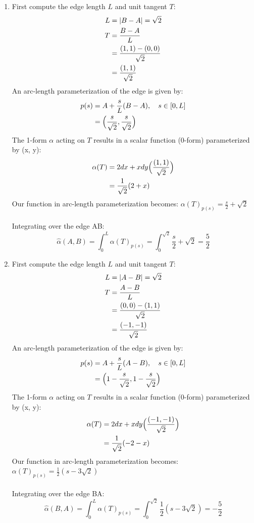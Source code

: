 \documentclass{article}
\newcommand\ifrac[2]{{\displaystyle\frac{#1}{#2}}}
\begin{document}
\begin{enumerate}[label=(\alph*)]
    \item
    First compute the edge length $L$ and unit tangent $T$:
    \begin{align}
        L &= |B - A| = \sqrt{2} \notag\\
        T   &= \frac{B - A}{L} \notag\\
            &= \frac{(1,1) - (0,0)}{\sqrt{2}}  \notag\\
            &=  \frac{(1,1)}{\sqrt{2}} \notag
    \end{align}
    An arc-length parameterization of the edge is given by:
    \begin{align}
        p(s) &= A + \frac{s}{L}(B - A), \quad s \in [0, L] \notag\\
            &= \Big(\frac{s}{\sqrt{2}}, \frac{s}{\sqrt{2}}\Big) \notag
    \end{align}
    The 1-form $\alpha$ acting on $T$ results in a scalar function (0-form) parameterized by (x, y):
    \begin{align}
        \alpha(T) &= 2dx + xdy\Big(\frac{(1,1)}{\sqrt{2}}\Big) \notag\\
            &= \frac{1}{\sqrt2}(2+x) \notag
    \end{align}
    Our function in arc-length parameterization becomes: $\alpha(T)_{p(s)} = \ifrac{s}{2}+\sqrt{2}$\\\\
    Integrating over the edge AB:
    $$
        \hat{\alpha}(A, B) = \int_0^L \alpha(T)_{p(s)} = \int_0^{\sqrt{2}} \frac{s}{2}+\sqrt{2} = \frac52
    $$

    \item
    First compute the edge length $L$ and unit tangent $T$:
    \begin{align}
        L &= |A - B| = \sqrt{2} \notag\\
        T   &= \frac{A - B}{L} \notag\\
            &= \frac{(0,0) - (1,1)}{\sqrt{2}}  \notag\\
            &=  \frac{(-1,-1)}{\sqrt{2}} \notag
    \end{align}
    An arc-length parameterization of the edge is given by:
    \begin{align}
        p(s) &= A + \frac{s}{L}(A - B), \quad s \in [0, L] \notag\\
            &= \Big(1-\frac{s}{\sqrt{2}},1-\frac{s}{\sqrt{2}}\Big) \notag
    \end{align}
    The 1-form $\alpha$ acting on $T$ results in a scalar function (0-form) parameterized by (x, y):
    \begin{align}
        \alpha(T) &= 2dx + xdy\Big(\frac{(-1,-1)}{\sqrt{2}}\Big) \notag\\
            &= \frac{1}{\sqrt2}(-2-x) \notag
    \end{align}
    Our function in arc-length parameterization becomes: $\alpha(T)_{p(s)} = \ifrac{1}{2} (s-3 \sqrt{2})$\\\\
    Integrating over the edge BA:
    $$
        \hat{\alpha}(B, A) = \int_0^L \alpha(T)_{p(s)} = \int_0^{\sqrt{2}} \ifrac{1}{2} (s-3 \sqrt{2}) = -\frac52
    $$


\end{enumerate}
\end{document}
